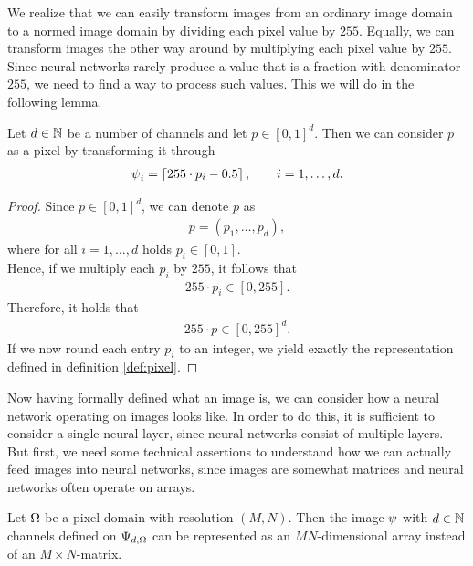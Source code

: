 We realize that we can easily transform images from an ordinary image domain to a normed image domain by dividing each pixel value by $255$. Equally, we can transform images the other way around by multiplying each pixel value by $255$.\\
Since neural networks rarely produce a value that is a fraction with denominator $255$, we need to find a way to process such values. This we will do in the following lemma.


\begin{lemma}
Let $d\in\operatorname{\mathbb{N}}$ be a number of channels and let $p\in [0,1]^d$. Then we can consider $p$ as a pixel by transforming it through
\begin{align*}
\operatorname{\psi}_i = \left\lceil 255 \cdot p_i - 0.5 \right\rceil, \qquad i=1,\ldots,d.
\end{align*}
\end{lemma}

\begin{proof}
Since $p\in[0,1]^d$, we can denote $p$ as
\begin{align*}
p = \left(p_1, \ldots, p_d\right),
\end{align*}
where for all $i=1,\ldots,d$ holds $p_i\in[0,1]$.\\
Hence, if we multiply each $p_i$ by $255$, it follows that
\begin{align*}
255\cdot p_i \in [0, 255].
\end{align*}
Therefore, it holds that
\begin{align*}
255\cdot p \in [0, 255]^d.
\end{align*}
If we now round each entry $p_i$ to an integer, we yield exactly the representation defined in definition \ref{def:pixel}.
\end{proof}

Now having formally defined what an image is, we can consider how a neural network operating on images looks like. In order to do this, it is sufficient to consider a single neural layer, since neural networks consist of multiple layers. But first, we need some technical assertions to understand how we can actually feed images into neural networks, since images are somewhat matrices and neural networks often operate on arrays.


\begin{lemma}\label{lemma:mat_as_array}
Let $\Omega$ be a pixel domain with resolution $(M,N)$. Then the image $\operatorname{\psi}$ with $d\in\operatorname{\mathbb{N}}$ channels defined on $\Psi_{d,\Omega}$ can be represented as an $MN$-dimensional array instead of an $M\times N$-matrix.
\end{lemma}


